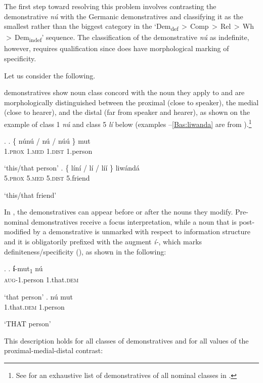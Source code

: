 The first step toward resolving this problem involves contrasting the demonstrative \textit{n\'u} with the Germanic demonstratives and classifying it as the smallest rather than the biggest category in the `Dem\textsubscript{def}\,$>$\,Comp\,$>$\,Rel\,$>$\,Wh\,$>$\,Dem\textsubscript{indef}' sequence. The classification of the demonstrative \textit{n\'u} as indefinite, however, requires qualification since does  have morphological marking of specificity.
\par
 Let us consider the following.
\par 
{} demonstratives show noun class concord with the noun they apply to and are morphologically distinguished between the proximal (close to speaker), the medial (close to hearer), and the distal (far from speaker and hearer), as shown on the example of class 1 \textit{n\'u} and class 5 \textit{l\'i} below (examples \Next--\ref{Bas:liwanda} are from \citealt{Makasso2010}).\footnote{See \cite{Hyman2003} for an exhaustive list of demonstratives of all nominal classes in .
} %

\ex. 
\ag. \{ n\'un\'u / n\'u / {n\'u\'u \}} mut \\
 {} 1.\textsc{prox} {} 1.\textsc{med} {} {1.\textsc{dist}} 1.person\\
\strut `this/that person'
\bg. \{ l\'in\'i / l\'i / {l\'i\'i \}} liw\'and\'a \\
 {} 5.\textsc{prox} {} 5.\textsc{med} {} {5.\textsc{dist}} 5.friend\\
\strut `this/that friend'

\noindent In , the demonstratives can appear before or after the nouns they modify. Pre-nominal demonstratives receive a focus interpretation, while a noun that is post-modified by a demonstrative is unmarked with respect to information structure and it is obligatorily prefixed with the augment \textit{\'i-}, which marks definiteness/specificity (\citealt{Jenks-etall}), as shown in the following: 

\ex.\label{Bas:i}
\ag.
\textbf{\'i}-mut\textsubscript{1} n\'u\\
\textsc{aug}-1.person 1.that.\textsc{dem}\\
\strut `that person' 
\bg.
n\'u mut\\
1.that.\textsc{dem} 1.person\\
\strut `THAT person'\label{B:unprefixednoun} 

\noindent
This description holds for all classes of demonstratives and for all values of the proximal-medial-distal contrast:

